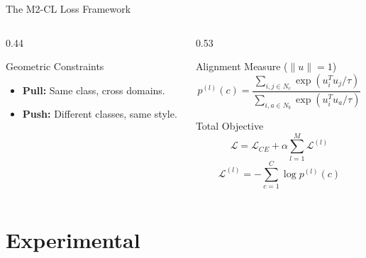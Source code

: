 \documentclass[t, aspectratio=169]{beamer} %
\begin{document}
	\begin{frame}{The M2-CL Loss Framework}
    \begin{columns}[t]
        \begin{column}{0.44\textwidth}
            \begin{block}{Geometric Constraints}
                \begin{itemize}
                    \item \textbf{Pull:} Same class, cross domains.
                    \item \textbf{Push:} Different classes, same style.
                \end{itemize}
            \end{block}
            
        
        \end{column}

        \begin{column}{0.53\textwidth}
            \begin{alertblock}{Alignment Measure ($\|u\|=1$)}
                \small
                \[ p^{(l)}(c) = \frac{\sum_{i, j \in N_c} \exp(u_i^{T}u_j / \tau)}{\sum_{i, a \in N_b} \exp(u_i^{T}u_a / \tau)} \]
            \end{alertblock}

            \begin{block}{Total Objective}
                \small
                \[ \mathcal{L} = \mathcal{L}_{CE} + \alpha \sum_{l=1}^{M} \mathcal{L}^{(l)} \]
                \[ \mathcal{L}^{(l)} = -\sum_{c=1}^{C}\log p^{(l)}(c) \]
                \scriptsize
            \end{block}
        \end{column}
    \end{columns}
\end{frame}

	\section{Experimental}
\end{document}
